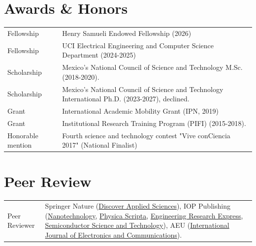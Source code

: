 \documentclass[letterpaper,10pt]{article}
\begin{document}
\section{Awards \& Honors}
\begin{tabularx}{\linewidth}{@{}l X@{}}	
Fellowship & Henry Samueli Endowed Fellowship (2026) \\
Fellowship & UCI Electrical Engineering and Computer Science Department (2024-2025) \\
Scholarship & Mexico’s National Council of Science and Technology M.Sc. (2018-2020). \\
Scholarship & Mexico’s National Council of Science and Technology International Ph.D. (2023-2027), declined. \\
Grant & International Academic Mobility Grant (IPN, 2019)\\
Grant & Institutional Research Training Program (PIFI) (2015-2018). \\
Honorable mention&Fourth science and technology contest "Vive conCiencia 2017" (National Finalist)
\end{tabularx}

\section{Peer Review}
\begin{tabularx}{\linewidth}{@{}l X@{}}	
Peer Reviewer & Springer Nature (\href{https://link.springer.com/journal/42452}{Discover Applied Sciences}), IOP Publishing (\href{https://iopscience.iop.org/journal/1361-6528}{Nanotechnology}, \href{https://iopscience.iop.org/journal/1402-4896}{Physica Scripta}, \href{https://iopscience.iop.org/journal/2631-8695}{Engineering Research Express}, \href{https://iopscience.iop.org/journal/0268-1242}{Semiconductor Science and Technology}), AEU (\href{https://www.sciencedirect.com/journal/aeu-international-journal-of-electronics-and-communications}{International Journal of Electronics and Communications}).
\end{tabularx}
\end{document}
